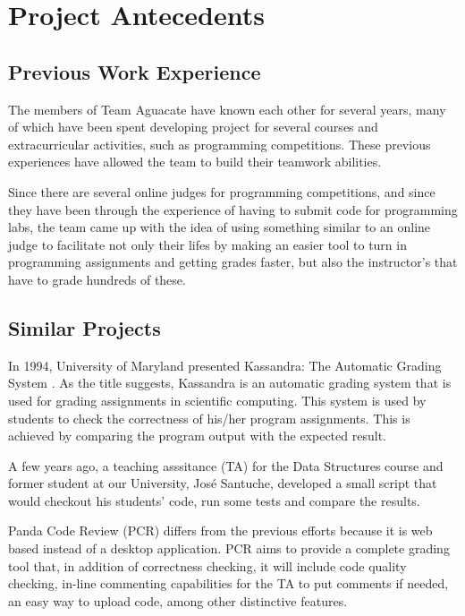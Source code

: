 \section{Project Antecedents}

\subsection{Previous Work Experience}
The members of Team Aguacate have known each other for several years, many of which have been spent developing project for several courses and extracurricular activities, such as programming competitions.  These previous experiences have allowed the team to build their teamwork abilities.

Since there are several online judges for programming competitions, and since they have been through the experience of having to submit code for programming labs, the team came up with the idea of using something similar to an online judge to facilitate not only their lifes by making an easier tool to turn in programming assignments and getting grades faster, but also the instructor's that have to grade hundreds of these.

\subsection{Similar Projects}

In 1994, University of Maryland presented Kassandra: The Automatic Grading System \cite{Matt1994}.  As the title suggests, Kassandra is an automatic grading system that is used for grading assignments in scientific computing.  This system is used by students to check the correctness of his/her program assignments.  This is achieved by comparing the program output with the expected result.

A few years ago, a teaching asssitance (TA) for the Data Structures course and former student at our University, José Santuche, developed a small script that would checkout his students' code, run some tests and compare the results.

Panda Code Review (PCR) differs from the previous efforts because it is web based instead of a desktop application. PCR aims to provide a complete grading tool that, in addition of correctness checking, it will include code quality checking, in-line commenting capabilities for the TA to put comments if needed, an easy way to upload code, among other distinctive features.
